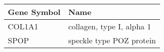 \begin{tabular}{ll}
\toprule
Gene Symbol &                      Name \\
\midrule
     COL1A1 & collagen, type I, alpha 1 \\
       SPOP &  speckle type POZ protein \\
\bottomrule
\end{tabular}
